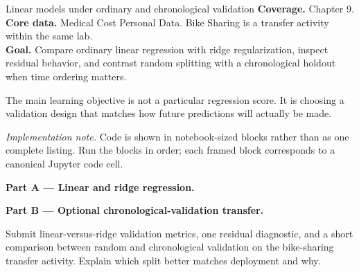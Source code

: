 
\begin{labproject}{Linear models under ordinary and chronological validation}
\textbf{Coverage.} Chapter 9.\\
\textbf{Core data.} Medical Cost Personal Data. Bike Sharing is a transfer activity within the same lab.\\
\textbf{Goal.} Compare ordinary linear regression with ridge regularization, inspect residual behavior, and contrast random splitting with a chronological holdout when time ordering matters.

\begin{labmode}
The main learning objective is not a particular regression score. It is choosing a validation design that matches how future predictions will actually be made.
\end{labmode}

\smallskip\noindent\textit{Implementation note.} Code is shown in notebook-sized blocks rather than as one complete listing. Run the blocks in order; each framed block corresponds to a canonical Jupyter code cell.\par

\medskip\noindent\textbf{Part A --- Linear and ridge regression.}\par







\medskip\noindent\textbf{Part B --- Optional chronological-validation transfer.}\par





\end{labproject}

\begin{labdeliverable}
Submit linear-versus-ridge validation metrics, one residual diagnostic, and a short comparison between random and chronological validation on the bike-sharing transfer activity. Explain which split better matches deployment and why.
\end{labdeliverable}
